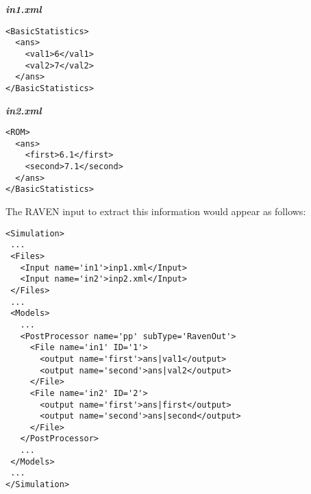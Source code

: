 \textbf{\emph{in1.xml}}
\begin{lstlisting}[style=XML]
<BasicStatistics>
  <ans>
    <val1>6</val1>
    <val2>7</val2>
  </ans>
</BasicStatistics>
\end{lstlisting}
\textbf{\emph{in2.xml}}
\begin{lstlisting}[style=XML]
<ROM>
  <ans>
    <first>6.1</first>
    <second>7.1</second>
  </ans>
</BasicStatistics>
\end{lstlisting}
The RAVEN input to extract this information would appear as follows:
\begin{lstlisting}[style=XML]
<Simulation>
 ...
 <Files>
   <Input name='in1'>inp1.xml</Input>
   <Input name='in2'>inp2.xml</Input>
 </Files>
 ...
 <Models>
   ...
   <PostProcessor name='pp' subType='RavenOut'>
     <File name='in1' ID='1'>
       <output name='first'>ans|val1</output>
       <output name='second'>ans|val2</output>
     </File>
     <File name='in2' ID='2'>
       <output name='first'>ans|first</output>
       <output name='second'>ans|second</output>
     </File>
   </PostProcessor>
   ...
 </Models>
 ...
</Simulation>
\end{lstlisting}

